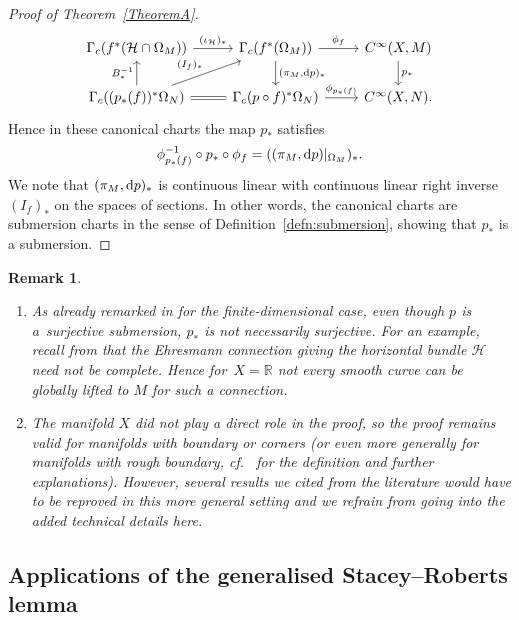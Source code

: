 \documentclass[pdftex]{sigma}
\numberwithin{equation}{section}
\newtheorem{Remark}[Theorem]{Remark} }
\newcommand{\cH}{\ensuremath{\mathcal{H}}}
\newcommand{\R}{\ensuremath{\mathbb{R}}}
\begin{document}
\begin{proof}[Proof of Theorem~\ref{TheoremA}]
\begin{displaymath}
\begin{tikzcd}
\Gamma_c (f^\ast (\cH \cap \Omega_M)) \arrow[r,"(\iota_{\cH})_\ast"] & \Gamma_c (f^\ast (\Omega_M)) \arrow[r, "\phi_f"] \arrow[d,"{(\pi_M ,{\rm d}p)_\ast}"] & C^\infty (X,M) \arrow[d, "p_\ast"] \\
\Gamma_c ((p_\ast(f))^\ast \Omega_N) \arrow[u,"B^{-1}_\ast"] \arrow[r,equal] \arrow[ru,"(I_f)_\ast"]& \Gamma_c (p \circ f)^\ast \Omega_N) \arrow[r,"\phi_{p_\ast (f)}"] &
C^\infty (X,N).
\end{tikzcd}
\end{displaymath}
Hence in these canonical charts the map $p_\ast$ satisfies
\begin{displaymath}
\phi^{-1}_{p_\ast(f)} \circ p_\ast \circ \phi_f = ((\pi_M,{\rm d}p)|_{\Omega_M})_\ast.
\end{displaymath}
We note that $(\pi_M,{\rm d}p)_\ast$ is continuous linear with continuous linear right inverse $(I_f)_\ast$ on the spaces of sections. In other words, the canonical charts are submersion charts in the sense of Definition~\ref{defn:submersion}, showing that $p_\ast$ is a submersion.
\end{proof}

\begin{Remark} \quad
\begin{enumerate}\itemsep=0pt
\item As already remarked in \cite{AaS19} for the finite-dimensional case, even though $p$ is a~surjective submersion, $p_\ast$ is not necessarily surjective. For an example, recall from \cite{dH16} that the Ehresmann connection giving the horizontal bundle $\cH$ need not be complete. Hence for~${X=\R}$ not every smooth curve can be globally lifted to $M$ for such a connection.

\item The manifold $X$ did not play a direct role in the proof, so the proof remains valid for manifolds with boundary or corners (or even more generally for manifolds with rough boundary, cf.\ \cite[\S2.3]{GaS22} for the definition and further explanations). However, several results we cited from the literature would have to be reproved in this more general setting and we refrain from going into the added technical details here.
\end{enumerate}
\end{Remark}

\subsection*{Applications of the generalised Stacey--Roberts lemma}
\end{document}
